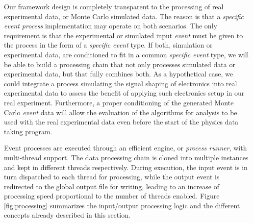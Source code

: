Our framework design is completely transparent to the processing of real experimental data, or Monte Carlo simulated data. The reason is that a \emph{specific event process} implementation may operate on both scenarios. The only requirement is that the experimental or simulated input \emph{event} must be given to the process in the form of a \emph{specific event} type. If both, simulation or experimental data, are conditioned to fit in a common \emph{specific event} type, we will be able to build a processing chain that not only processes simulated data or experimental data, but that fully combines both. As a hypothetical case, we could integrate a process simulating the signal shaping of electronics into real experimental data to assess the benefit of applying such electronics setup in our real experiment. Furthermore, a proper conditioning of the generated Monte Carlo \emph{event} data will allow the evaluation of the algorithms for analysis to be used with the real experimental data even before the start of the physics data taking program.

Event processes are executed through an efficient engine, or \emph{process runner}, with multi-thread support. The data processing chain is cloned into multiple instances and kept in different threads respectively. During execution, the input event is in turn dispatched to each thread for processing, while the output event is redirected to the global output file for writing, leading to an increase of processing speed proportional to the number of threads enabled. Figure\,\ref{fig:processing} summarizes the input/output processing logic and the different concepts already described in this section.   %

